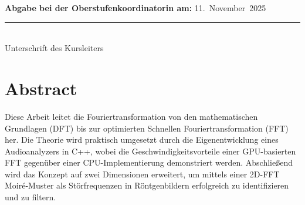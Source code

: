 \documentclass[a4paper,12pt]{article}
\theoremstyle{definition}
\theoremstyle{remark}
\begin{document}
\begin{center}
\begin{flushleft}
\vspace{0.8cm}

\textbf{Abgabe bei der Oberstufenkoordinatorin am:} 11.\ November\ 2025
\end{flushleft}

\vfill

\begin{flushright}
\rule{5cm}{0.4pt}\\
Unterschrift des Kursleiters
\end{flushright}

\end{center}

\renewcommand{\contentsname}{Inhaltsverzeichnis}
\tableofcontents

\newpage

\section{Abstract}
Diese Arbeit leitet die Fouriertransformation von den mathematischen Grundlagen (DFT) bis zur optimierten Schnellen 
Fouriertransformation (FFT) her. Die Theorie wird praktisch umgesetzt durch die Eigenentwicklung eines Audioanalyzers 
in C++, wobei die Geschwindigkeitsvorteile einer GPU-basierten FFT gegenüber einer CPU-Implementierung demonstriert 
werden. Abschließend wird das Konzept auf zwei Dimensionen erweitert, um mittels einer 2D-FFT Moiré-Muster als 
Störfrequenzen in Röntgenbildern erfolgreich zu identifizieren und zu filtern.
\end{document}
